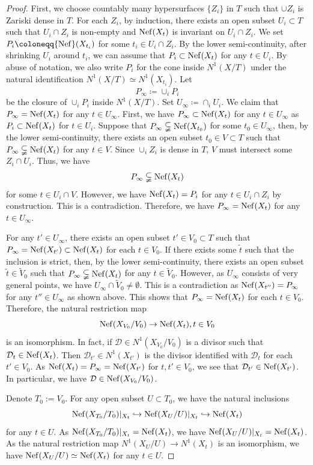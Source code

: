 \documentclass[11pt,oneside,reqno]{amsart}
\numberwithin{equation}{section}
\theoremstyle{definition}
\newcommand{\Nef}{{\rm {Nef}}}
\newcommand{\mD}{\mathcal{D}}
\begin{document}
\begin{proof}
First, we choose countably many hypersurfaces $\{Z_i\}$ in $T$ such that $\cup Z_i$ is Zariski dense in $T$. For each $Z_i$, by induction, there exists an open subset $U_i\subset T$ such that $U_i\cap Z_i$ is non-empty and $\Nef(X_t)$ is invariant on $U_i\cap Z_i$. We set $P_i\coloneqq\Nef(X_{t_i})$ for some $t_i\in U_i\cap Z_i$. By the lower semi-continuity, after shrinking $U_i$ around $t_i$, we can assume that $P_i \subset \Nef(X_t)$ for any $t\in U_i$. By abuse of notation, we also write $P_i$ for the cone inside $N^1(X/T)$ under the natural identification $N^1(X/T) \simeq N^1(X_{t_i})$. Let 
\[
P_\infty\coloneqq\overline{\cup_i P_i}
\] be the closure of $\cup_i P_i$ inside $N^1(X/T)$. Set $U_\infty\coloneqq\cap_i U_i$. We claim that $P_\infty=\Nef(X_t)$ for any $t\in U_\infty$. First, we have $P_\infty\subset \Nef(X_t)$ for any $t\in U_\infty$ as $P_i \subset \Nef(X_t)$ for $t\in U_i$. Suppose that $P_\infty\subsetneqq \Nef(X_{t_0})$ for some $t_0\in U_\infty$, then, by the lower semi-continuity,  there exists an open subset $t_0\in V\subset T$ such that $P_\infty\subsetneqq \Nef(X_t)$ for any $t\in V$. Since $\cup_i Z_i$ is dense in $T$, $V$ must intersect some $Z_i\cap U_i$. Thus, we have
\[
P_\infty\subsetneqq \Nef(X_t)
\] for some $t\in U_i\cap V$. However, we have $\Nef(X_t)= P_i$ for any $t\in U_i \cap Z_i$ by construction. This is a contradiction. Therefore, we have $P_\infty=\Nef(X_t)$ for any $t\in U_\infty$.

For any $t'\in U_\infty$, there exists an open subset $t'\in V_0\subset T$ such that $P_\infty=\Nef(X_{t'}) \subset \Nef(X_t)$ for each $t\in V_0$. If there exists some $\tilde t$ such that the inclusion is strict, then, by the lower semi-continuity, there exists an open subset $\tilde t \in \tilde V_0$ such that $P_\infty \subsetneqq \Nef(X_t)$ for any $t\in \tilde V_0$. However, as $U_\infty$ consists of very general points, we have $U_\infty \cap \tilde V_0 \neq \emptyset$. This is a contradiction as $\Nef(X_{t''})=P_\infty$ for any $t''\in U_\infty$ as shown above. This shows that $P_\infty= \Nef(X_t)$ for each $t\in V_0$. Therefore, the natural restriction map
\[
\Nef(X_{V_0}/V_0) \to \Nef(X_t), t\in V_0
\] is an isomorphism. In fact, if $\mD\in N^1(X_{V_0}/V_0)$ is a divisor such that $\mD_t\in \Nef(X_t)$. Then $\mD_{t'} \in N^1(X_{t'})$ is the divisor identified with $\mD_t$ for each $t'\in V_0$. As $ \Nef(X_t)=P_\infty= \Nef(X_{t'})$ for $t, t'\in V_0$, we see that $\mD_{t'} \in \Nef(X_{t'})$. In particular, we have $\mD \in \Nef(X_{V_0}/V_0)$.

Denote $T_0:=V_0$. For any open subset $U\subset T_0$, we have the natural inclusions
\[
\Nef(X_{T_0}/T_0)|_{X_t} \hookrightarrow \Nef(X_U/U)|_{X_t} \hookrightarrow \Nef(X_t)
\] for any $t\in U$. As $\Nef(X_{T_0}/T_0)|_{X_t}= \Nef(X_t)$, we have $\Nef(X_U/U)|_{X_t} = \Nef(X_t)$. As the natural restriction map $N^1(X_U/U) \to N^1(X_t)$ is an isomorphism, we have $\Nef(X_U/U) \simeq \Nef(X_t)$ for any $t\in U$.


\end{proof}
\end{document}
